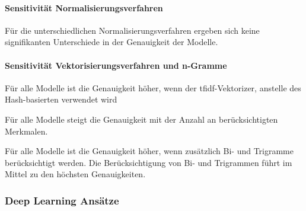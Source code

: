 \paragraph{Sensitivität Normalisierungsverfahren}

Für die unterschiedlichen Normalisierungsverfahren ergeben sich keine signifikanten Unterschiede in der Genauigkeit der Modelle.

\paragraph{Sensitivität Vektorisierungsverfahren und n-Gramme}

Für alle Modelle ist die Genauigkeit höher, wenn der \gls{tfidf}-Vektorizer, anstelle des Hash-basierten verwendet wird

Für alle Modelle steigt die Genauigkeit mit der Anzahl an berücksichtigten Merkmalen.

Für alle Modelle ist die Genauigkeit höher, wenn zusätzlich Bi- und Trigramme berücksichtigt werden.
Die Berücksichtigung von Bi- und Trigrammen führt im Mittel zu den höchsten Genauigkeiten.

\subsubsection{Deep Learning Ansätze}
